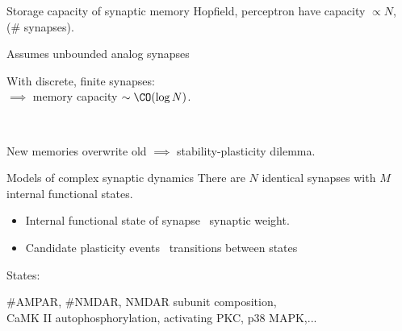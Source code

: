 \documentclass[final]{beamer}%
\begin{document}
\begin{frame}{Storage capacity of synaptic memory}
%
  Hopfield, perceptron have capacity $\propto N$, (\# synapses).

\vp\parbox[t]{0.59\linewidth}{%
  Assumes unbounded analog synapses

 \vp With discrete, finite synapses:\\
 $\implies$ memory capacity  $\sim\CO(\log N)$.
 \\ 
 }
 \parbox[t]{0.4\linewidth}{
    \hfill{}
 }
 \\

 \vp New memories overwrite old
 $\implies$ stability-plasticity dilemma.
%
\end{frame}



\begin{frame}{Models of complex synaptic dynamics}
%
  There are $N$ identical synapses with $M$ internal functional states.
%
\parbox[c]{0.82\linewidth}{%
  \begin{itemize}
    \item Internal functional state of synapse \lto\ synaptic weight.
    \item Candidate plasticity events \lto\ transitions between states
  \end{itemize}
}\hfill
{}
%

  \begin{center}
  \end{center}

  States: \parbox[t]{0.85\linewidth}{\#AMPAR, \#NMDAR, NMDAR subunit composition, \\
  CaMK II autophosphorylation, activating PKC, p38 MAPK,...}

  \vp \footnotesize{}%
\end{frame}
\end{document}

